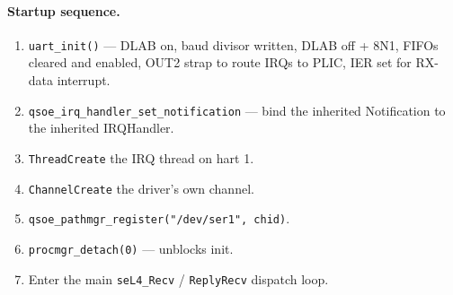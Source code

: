 \paragraph{Startup sequence.}
\begin{enumerate}
    \item \texttt{uart\_init()} — DLAB on, baud divisor written,
          DLAB off + 8N1, FIFOs cleared and enabled, OUT2 strap to
          route IRQs to PLIC, IER set for RX-data interrupt.
    \item \texttt{qsoe\_irq\_handler\_set\_notification} — bind the
          inherited Notification to the inherited IRQHandler.
    \item \texttt{ThreadCreate} the IRQ thread on hart 1.
    \item \texttt{ChannelCreate} the driver's own channel.
    \item \texttt{qsoe\_pathmgr\_register("/dev/ser1", chid)}.
    \item \texttt{procmgr\_detach(0)} — unblocks init.
    \item Enter the main \texttt{seL4\_Recv} / \texttt{ReplyRecv}
          dispatch loop.
\end{enumerate}
